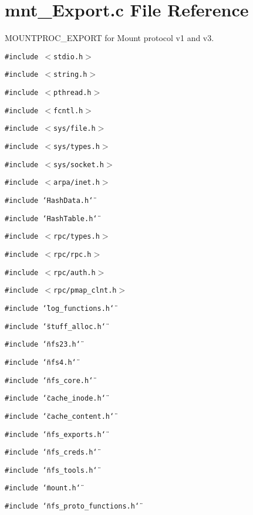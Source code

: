\section{mnt\_\-Export.c File Reference}
\label{mnt__Export_8c}
MOUNTPROC\_\-EXPORT for Mount protocol v1 and v3. 

{\tt \#include $<$stdio.h$>$}\par
{\tt \#include $<$string.h$>$}\par
{\tt \#include $<$pthread.h$>$}\par
{\tt \#include $<$fcntl.h$>$}\par
{\tt \#include $<$sys/file.h$>$}\par
{\tt \#include $<$sys/types.h$>$}\par
{\tt \#include $<$sys/socket.h$>$}\par
{\tt \#include $<$arpa/inet.h$>$}\par
{\tt \#include \char`\"{}Hash\-Data.h\char`\"{}}\par
{\tt \#include \char`\"{}Hash\-Table.h\char`\"{}}\par
{\tt \#include $<$rpc/types.h$>$}\par
{\tt \#include $<$rpc/rpc.h$>$}\par
{\tt \#include $<$rpc/auth.h$>$}\par
{\tt \#include $<$rpc/pmap\_\-clnt.h$>$}\par
{\tt \#include \char`\"{}log\_\-functions.h\char`\"{}}\par
{\tt \#include \char`\"{}stuff\_\-alloc.h\char`\"{}}\par
{\tt \#include \char`\"{}nfs23.h\char`\"{}}\par
{\tt \#include \char`\"{}nfs4.h\char`\"{}}\par
{\tt \#include \char`\"{}nfs\_\-core.h\char`\"{}}\par
{\tt \#include \char`\"{}cache\_\-inode.h\char`\"{}}\par
{\tt \#include \char`\"{}cache\_\-content.h\char`\"{}}\par
{\tt \#include \char`\"{}nfs\_\-exports.h\char`\"{}}\par
{\tt \#include \char`\"{}nfs\_\-creds.h\char`\"{}}\par
{\tt \#include \char`\"{}nfs\_\-tools.h\char`\"{}}\par
{\tt \#include \char`\"{}mount.h\char`\"{}}\par
{\tt \#include \char`\"{}nfs\_\-proto\_\-functions.h\char`\"{}}\par
